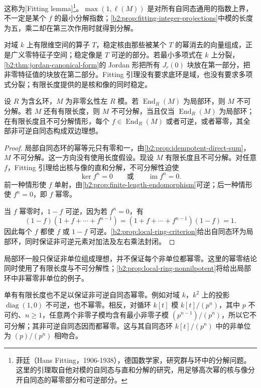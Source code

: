 这称为[Fitting lemma]\footnote{菲廷（Hans Fitting，1906-1938），德国数学家，研究群与环中的分解问题。这里的引理取自他对模的自同态与直和分解的研究，用足够高次幂的核与像分开自同态的幂零部分和可逆部分。}。\(\max(1,\ell(M))\) 是对所有自同态通用的指数上界，不一定是某个 \(f\) 的最小分解指数；\cref{b2:prop:fitting-integer-projections}中模的长度为五，乘二却在第三次作用时就得到分解。

\ProseParagraphBreak
对域 \(k\) 上有限维空间的算子 \(T\)，稳定核由那些被某个 \(T\) 的幂消去的向量组成，正是广义零特征子空间；稳定像是 \(T\) 可逆的部分。若最小多项式在 \(k\) 上分裂，\cref{b2:thm:jordan-canonical-form}的 Jordan 形把所有 \(J_r(0)\) 块放在第一部分，把非零特征值的块放在第二部分。Fitting 引理没有要求底环是域，也没有要求多项式分裂；有限长度提供的是核和像的同时稳定。

\begin{theorem}\label{b2:thm:indecomposable-local-end}
	设 \(R\) 为含幺环，\(M\) 为非零幺性左 \(R\) 模。若 \(\operatorname{End}_R(M)\) 为局部环，则 \(M\) 不可分解。若 \(M\) 还有有限长度，则 \(M\) 不可分解，当且仅当 \(\operatorname{End}_R(M)\) 为局部环；在有限长度且不可分解情形，每个 \(f\in\operatorname{End}_R(M)\) 或者可逆，或者幂零，其全部非可逆自同态构成双边理想。
\end{theorem}
\begin{proof}
	局部自同态环的幂等元只有零和一，由\cref{b2:prop:idempotent-direct-sum}，\(M\) 不可分解。这一方向没有使用长度假设。现设 \(M\) 有限长度且不可分解。对任意 \(f\)，Fitting 引理给出核与像的直和分解，不可分解性迫使
	\[
		\ker f^n=0\qquad\text{或}\qquad\operatorname{im}f^n=0.
	\]
	前一种情形使 \(f\) 单射，由\cref{b2:prop:finite-length-endomorphism}可逆；后一种情形使 \(f^n=0\)，即 \(f\) 幂零。

	当 \(f\) 幂零时，\(1-f\) 可逆，因为若 \(f^n=0\)，有
	\[
		(1-f)(1+f+\cdots+f^{n-1}) =(1+f+\cdots+f^{n-1})(1-f)=1.
	\]
	因此每个 \(f\) 都使 \(f\) 或 \(1-f\) 可逆。\cref{b2:prop:local-ring-criterion}给出自同态环为局部环，同时保证非可逆元素对加法及左右乘法封闭。
\end{proof}

局部环一般只保证非单位组成理想，并不保证每个非单位都幂零。这里的幂零结论同时使用了有限长度与不可分解性；\cref{b2:prop:local-ring-nonnilpotent}将给出局部环中非幂零非单位的例子。

\ProseParagraphBreak

单有有限长度也不足以保证非可逆自同态幂零。例如对域 \(k\)，\(k^2\) 上的投影 \(\operatorname{diag}(1,0)\) 不可逆，也不幂零。相反，对循环 \(k[t]\) 模 \(k[t]/(p^n)\)，其中 \(p\) 不可约、\(n\ge1\)，任意两个非零子模均含有最小非零子模 \((p^{n-1})/(p^n)\)，所以它不可分解；其非可逆自同态因而都幂零。这与其自同态环 \(k[t]/(p^n)\) 中的非单位为 \((p)/(p^n)\) 相吻合。

